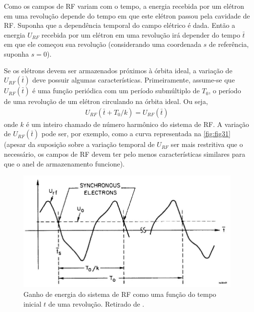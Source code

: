 Como os campos de RF variam com o tempo, a energia recebida por um elétron em uma revolução depende do tempo em que este elétron passou pela cavidade de RF. Suponha que a dependência temporal do campo elétrico é dada. Então a energia $U_{RF}$ recebida por um elétron em uma revolução irá depender do tempo $\bar{t}$ em que ele começou sua revolução (considerando uma coordenada $s$ de referência, suponha $s=0$).

Se os elétrons devem ser armazenados próximos à órbita ideal, a variação de $U_{RF}(\bar{t})$ deve possuir algumas características. Primeiramente, assume-se que $U_{RF}(\bar{t})$ é uma função periódica com um período submúltiplo de $T_0$, o período de uma revolução de um elétron circulando na órbita ideal. Ou seja,
\begin{align}
	U_{RF}(\bar{t}+T_0/k) = U_{RF}(\bar{t})\label{eq:3.25}
\end{align}
onde $k$ é um inteiro chamado de número harmônico do sistema de RF. A variação de $U_{RF}(\bar{t})$ pode ser, por exemplo, como a curva representada na \autoref{fig:fig31} (apesar da suposição sobre a variação temporal de $U_{RF}$ ser mais restritiva que o necessário, os campos de RF devem ter pelo menos características similares para que o anel de armazenamento funcione).

\begin{figure}[!htb]
	\centering
	\includegraphics[width=0.85\linewidth]{./Figuras/fig31.jpeg}
	\caption{Ganho de energia do sistema de RF como uma função do tempo inicial $t$ de uma revolução. Retirado de \cite{sands1970physics}.}
	\label{fig:fig31}
\end{figure}

